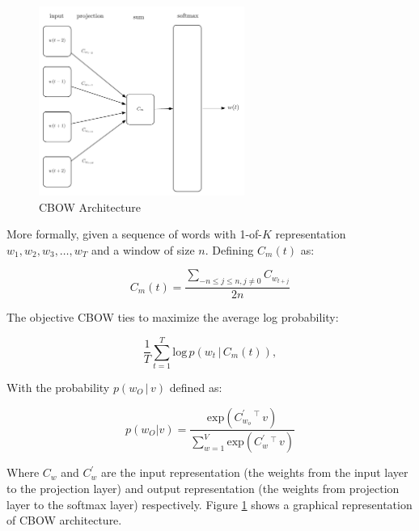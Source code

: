 \begin{figure}[hptb!]
    \centering
    \includegraphics[width=0.6\textwidth]{images/word2vec-cbow-latex.pdf} 
    \caption{CBOW Architecture}
    \label{fig:cbow-architecture-alone}
\end{figure}

More formally, given a sequence of words with 1-of-$K$ representation $w_1,w_2,w_3, \dots, w_T$ and a window
of size $n$. Defining $C_m(t)$ as:

\begin{equation}
\label{eq:cbow-mean}
   C_{m}(t) =    \frac{\sum_{-n \leq j \leq n, j \neq 0} { 
       C_{w_{t+j}}} } {2n}    
\end{equation}

The  objective  \ac{CBOW}  ties to maximize the average log probability:


\begin{equation}
  \label{eq:logprob-cbow}
   \frac{1}{T} \sum^{T}_{t=1} \text{log} \, p
     \left( w_t \, |\, C_{m}(t) \right),
\end{equation}



With the probability  $p\left( w_O \, |\, v \right)$  defined as:

\begin{equation}
  \label{eq:logp-cbow}
  p(w_O|v) = \frac{\text{exp}\left(C^{'}_{w_o}\,^\top\,v \right)
  }{\sum^{V}_{w=1} \text{exp} \left( C^{'}_w \,^\top\, v \right)   }  
\end{equation}


Where $C_w$ and $C^{'}_w$ are the input representation (the weights from the input layer to the
projection layer) and output representation (the weights from
projection layer to the softmax layer) respectively.   Figure
\ref{fig:cbow-architecture-alone} shows a graphical representation of
\ac{CBOW} architecture.

